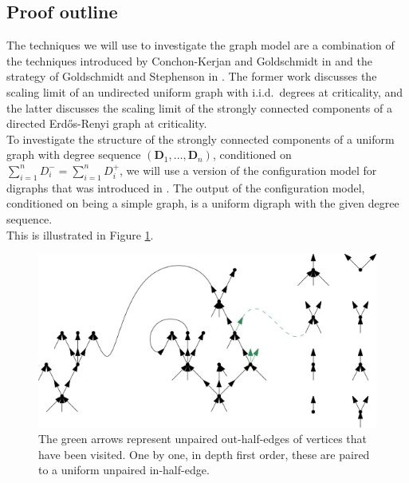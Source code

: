 \subsection{Proof outline}
The techniques we will use to investigate the graph model are a combination of the techniques introduced by Conchon-Kerjan and Goldschmidt in \cite{Conchon2018} and the strategy of Goldschmidt and Stephenson in \cite{Goldschmidt2019}. The former work discusses the scaling limit of an undirected uniform graph with i.i.d.\ degrees at criticality, and the latter discusses the scaling limit of the strongly connected components of a directed Erd\H{o}s-Renyi graph at criticality.\\
To investigate the structure of the strongly connected components of a uniform graph with degree sequence $(\mathbf{D}_1,\dots,\mathbf{D}_n)$, conditioned on $\sum_{i=1}^n D^-_i=\sum_{i=1}^n D^+_i$, we will use a version of the configuration model for digraphs that was introduced in \cite{Cooper2004}. The output of the configuration model, conditioned on being a simple graph, is a uniform digraph with the given degree sequence. \\
 This is illustrated in Figure \ref{fig.configuration model}. 
\begin{figure}
    \centering
    \includegraphics[scale=0.6]{Content/Pictures/Configuration model.png}
    \caption{The green arrows represent unpaired out-half-edges of vertices that have been visited. One by one, in depth first order, these are paired to a uniform unpaired in-half-edge.}
    \label{fig.configuration model}
\end{figure}\\
